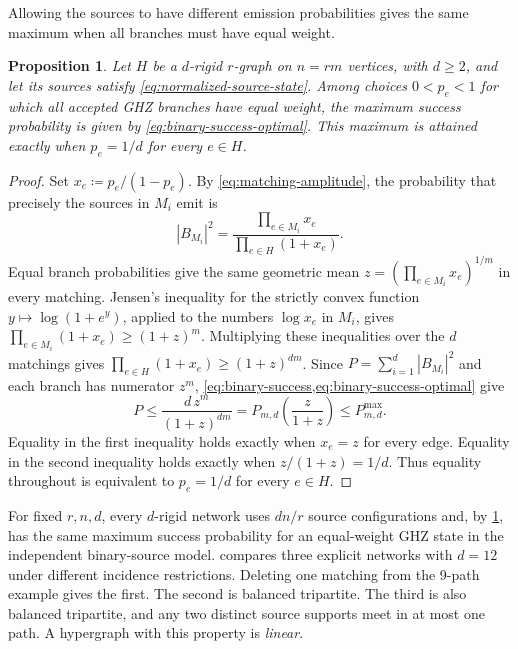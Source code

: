 \documentclass[10pt]{article}
\numberwithin{equation}{section}
\newtheorem{proposition}[proposition]{Proposition}
\theoremstyle{definition}
\begin{document}
Allowing the sources to have different emission probabilities gives the same maximum when all branches must have equal weight.

\begin{proposition}\label{prop:balanced-pump}
Let $H$ be a $d$-rigid $r$-graph on $n=rm$ vertices, with $d\ge2$, and let its sources satisfy \cref{eq:normalized-source-state}. Among choices $0<p_e<1$ for which all accepted GHZ branches have equal weight, the maximum success probability is given by \cref{eq:binary-success-optimal}. This maximum is attained exactly when $p_e=1/d$ for every $e\in H$.
\end{proposition}
\begin{proof}
Set $x_e\coloneqq p_e/(1-p_e)$. By \cref{eq:matching-amplitude}, the probability that precisely the sources in $M_i$ emit is
\[
 |B_{M_i}|^2=\frac{\prod_{e\in M_i}x_e}{\prod_{e\in H}(1+x_e)}.
\]
Equal branch probabilities give the same geometric mean $z=(\prod_{e\in M_i}x_e)^{1/m}$ in every matching. Jensen's inequality for the strictly convex function $y\mapsto\log(1+e^y)$, applied to the numbers $\log x_e$ in $M_i$, gives $\prod_{e\in M_i}(1+x_e)\ge(1+z)^m$. Multiplying these inequalities over the $d$ matchings gives $\prod_{e\in H}(1+x_e)\ge(1+z)^{dm}$. Since $P=\sum_{i=1}^d |B_{M_i}|^2$ and each branch has numerator $z^m$, \cref{eq:binary-success,eq:binary-success-optimal} give
\[
 P\le\frac{d\,z^m}{(1+z)^{dm}}
   =P_{m,d}\!\left(\frac{z}{1+z}\right)\le P_{m,d}^{\max}.
\]
Equality in the first inequality holds exactly when $x_e=z$ for every edge. Equality in the second inequality holds exactly when $z/(1+z)=1/d$. Thus equality throughout is equivalent to $p_e=1/d$ for every $e\in H$.
\end{proof}

For fixed $r,n,d$, every $d$-rigid network uses $dn/r$ source configurations and, by \cref{prop:balanced-pump}, has the same maximum success probability for an equal-weight GHZ state in the independent binary-source model.  compares three explicit networks with $d=12$ under different incidence restrictions. Deleting one matching from the 9-path example gives the first. The second is balanced tripartite. The third is also balanced tripartite, and any two distinct source supports meet in at most one path. A hypergraph with this property is \emph{linear}.
\end{document}
